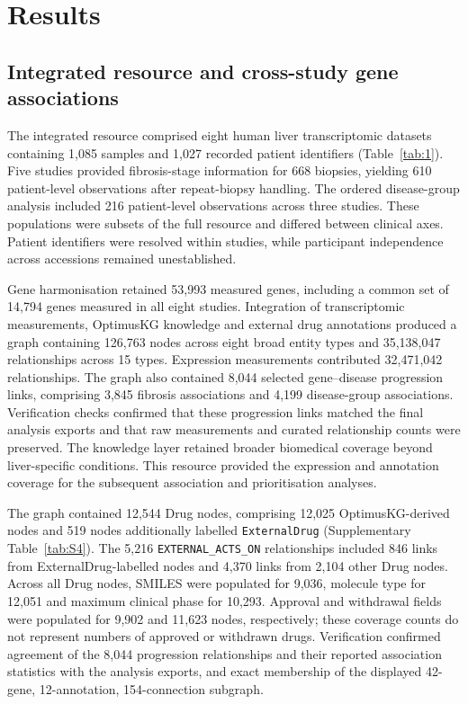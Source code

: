 \documentclass[11pt,a4paper]{article}
\begin{document}
\section*{Results}




\subsection*{Integrated resource and cross-study gene associations}
The integrated resource comprised eight human liver transcriptomic datasets containing 1,085 samples and 1,027 recorded patient identifiers (Table~\ref{tab:1}). Five studies provided fibrosis-stage information for 668 biopsies, yielding 610 patient-level observations after repeat-biopsy handling. The ordered disease-group analysis included 216 patient-level observations across three studies. These populations were subsets of the full resource and differed between clinical axes. Patient identifiers were resolved within studies, while participant independence across accessions remained unestablished.

Gene harmonisation retained 53,993 measured genes, including a common set of 14,794 genes measured in all eight studies. Integration of transcriptomic measurements, OptimusKG knowledge and external drug annotations produced a graph containing 126,763 nodes across eight broad entity types and 35,138,047 relationships across 15 types. Expression measurements contributed 32,471,042 relationships. The graph also contained 8,044 selected gene–disease progression links, comprising 3,845 fibrosis associations and 4,199 disease-group associations. Verification checks confirmed that these progression links matched the final analysis exports and that raw measurements and curated relationship counts were preserved. The knowledge layer retained broader biomedical coverage beyond liver-specific conditions. This resource provided the expression and annotation coverage for the subsequent association and prioritisation analyses.

The graph contained 12,544 Drug nodes, comprising 12,025 OptimusKG-derived nodes and 519 nodes additionally labelled \texttt{ExternalDrug} (Supplementary Table~\ref{tab:S4}). The 5,216 \texttt{EXTERNAL\_ACTS\_ON} relationships included 846 links from ExternalDrug-labelled nodes and 4,370 links from 2,104 other Drug nodes. Across all Drug nodes, SMILES were populated for 9,036, molecule type for 12,051 and maximum clinical phase for 10,293. Approval and withdrawal fields were populated for 9,902 and 11,623 nodes, respectively; these coverage counts do not represent numbers of approved or withdrawn drugs. Verification confirmed agreement of the 8,044 progression relationships and their reported association statistics with the analysis exports, and exact membership of the displayed 42-gene, 12-annotation, 154-connection subgraph.
\end{document}
